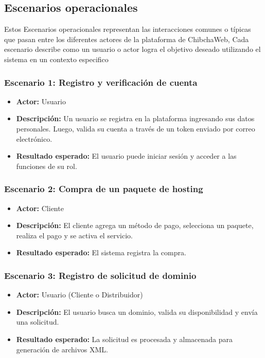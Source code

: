 \subsection{Escenarios operacionales}
Estos Escenarios operacionales representan las interacciones comunes o típicas que pasan entre los diferentes actores de la plataforma de ChibchaWeb, Cada escenario describe como un usuario o actor logra el objetivo deseado utilizando el sistema en un contexto especifico

\subsubsection{Escenario 1: Registro y verificación de cuenta}

\begin{itemize}
\item \textbf{Actor:} Usuario
\item \textbf{Descripción:} Un usuario se registra en la plataforma ingresando sus datos personales. Luego, valida su cuenta a través de un token enviado por correo electrónico.
\item \textbf{Resultado esperado:} El usuario puede iniciar sesión y acceder a las funciones de su rol.
\end{itemize}

\subsubsection{Escenario 2: Compra de un paquete de hosting}

\begin{itemize}
\item \textbf{Actor:} Cliente
\item \textbf{Descripción:} El cliente agrega un método de pago, selecciona un paquete, realiza el pago y se activa el servicio.
\item \textbf{Resultado esperado:} El sistema registra la compra.
\end{itemize}

\subsubsection{Escenario 3: Registro de solicitud de dominio}

\begin{itemize}
\item \textbf{Actor:} Usuario (Cliente o Distribuidor)
\item \textbf{Descripción:} El usuario busca un dominio, valida su disponibilidad y envía una solicitud.
\item \textbf{Resultado esperado:} La solicitud es procesada y almacenada para generación de archivos XML.
\end{itemize}


